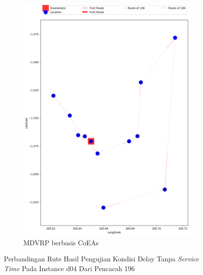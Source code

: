 \begin{figure}[H]
	\centering
	\begin{subfigure}[t]{\textwidth}
		\centering
		\includegraphics[width=\textwidth]{Resources/Images/delayed_5/real_m15_n100_delayed_5_196_coes}
		\caption{MDVRP berbasis CoEAs}
		\label{fig:real_m15_n100_delayed_5_196_coes}
	\end{subfigure}
	\caption{Perbandingan Rute Hasil Pengujian Kondisi Delay Tanpa \textit{Service Time} Pada Instance d04 Dari Pencacah 196}
	\label{fig:real_m15_n100_delayed_5_196}
\end{figure}


